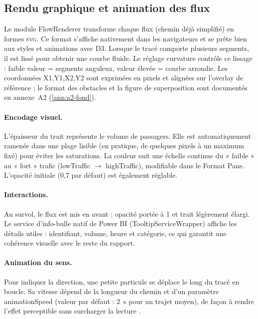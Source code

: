 \subsection{Rendu graphique et animation des flux}
\label{subsec:4A-rendering}

\setlength{\parindent}{0pt}

Le module FlowRenderer transforme chaque flux (chemin déjà simplifié) en formes \textsc{svg}. Ce format s’affiche nativement dans les navigateurs et se prête bien aux styles et animations avec D3. Lorsque le tracé comporte plusieurs segments, il est lissé pour obtenir une courbe fluide. Le réglage curvature contrôle ce lissage : faible valeur = segments anguleux, valeur élevée = courbe arrondie. Les coordonnées X1,Y1,X2,Y2 sont exprimées en pixels et alignées sur l’overlay de référence ; le format des obstacles et la figure de superposition sont documentés en annexe~A2 (\autoref{ann:a2-fond}).

\paragraph{Encodage visuel.}
L’épaisseur du trait représente le volume de passagers. Elle est automatiquement ramenée dans une plage lisible (en pratique, de quelques pixels à un maximum fixé) pour éviter les saturations. La couleur suit une échelle continue du « faible » au « fort » trafic (lowTraffic $\rightarrow$ highTraffic), modifiable dans le Format Pane. L’opacité initiale (0{,}7 par défaut) est également réglable.

\paragraph{Interactions.}
Au survol, le flux est mis en avant : opacité portée à 1 et trait légèrement élargi. Le service d’info-bulle natif de Power BI (TooltipServiceWrapper) affiche les détails utiles : identifiant, volume, heure et catégorie, ce qui garantit une cohérence visuelle avec le reste du rapport.

\paragraph{Animation du sens.}
Pour indiquer la direction, une petite particule se déplace le long du tracé en boucle. Sa vitesse dépend de la longueur du chemin et d’un paramètre animationSpeed (valeur par défaut : 2~s pour un trajet moyen), de façon à rendre l’effet perceptible sans surcharger la lecture \parencite{meulemans2017}.

